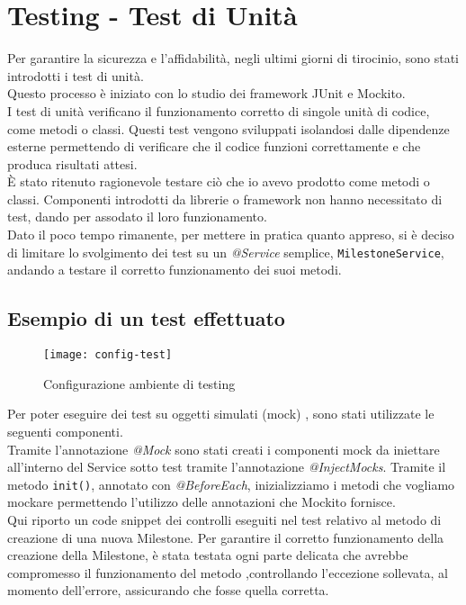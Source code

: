 \section{Testing - Test di Unità}
Per garantire la sicurezza e l’affidabilità, negli ultimi giorni di tirocinio, sono stati introdotti i test di unità.\\
Questo processo è iniziato con lo studio dei framework JUnit e Mockito.\\
I test di unità verificano il funzionamento corretto di singole unità di codice, come metodi o classi. Questi test vengono sviluppati isolandosi dalle dipendenze esterne permettendo di verificare che il codice funzioni correttamente e che produca risultati attesi.\\
È stato ritenuto ragionevole testare ciò che io avevo prodotto come metodi o classi. Componenti introdotti da librerie o framework non hanno necessitato di test, dando per assodato il loro funzionamento.\\
Dato il poco tempo rimanente, per mettere in pratica quanto appreso, si è deciso di limitare lo svolgimento dei test su un \textit{@Service} semplice, \texttt{MilestoneService}, andando a testare il corretto funzionamento dei suoi metodi.

\subsection{Esempio di un test effettuato}
\begin{figure}[H] 
    \centering 
    \texttt{[image: config-test]} 
    \caption{Configurazione ambiente di testing}
\end{figure}
Per poter eseguire dei test su oggetti simulati (mock) , sono stati utilizzate le seguenti componenti.\\
Tramite l'annotazione \textit{@Mock} sono stati creati i componenti mock da iniettare all’interno del Service sotto test tramite l’annotazione \textit{@InjectMocks}. Tramite il metodo \texttt{init()}, annotato con \textit{@BeforeEach}, inizializziamo i metodi che vogliamo mockare permettendo l’utilizzo delle annotazioni che Mockito fornisce.\\
Qui riporto un code snippet dei controlli eseguiti nel test relativo al metodo di creazione di una nuova Milestone. Per garantire il corretto funzionamento della creazione della Milestone, è stata testata ogni parte delicata che avrebbe compromesso il funzionamento del metodo ,controllando l’eccezione sollevata, al momento dell’errore, assicurando che fosse quella corretta.\\

